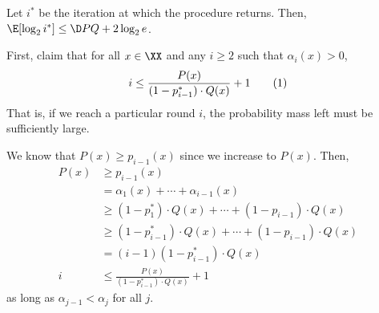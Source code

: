 \documentclass[class=co432,notes,tikz]{agony}
\begin{document}
\begin{prop}\label{prop:rejworst}
  Let $i^*$ be the iteration at which the procedure returns.
  Then, $\E[\log_2 i^*] \leq \D P Q + 2\log_2 e$.
\end{prop}
\begin{prf}
  First, claim that for all $x \in \XX$ and any $i \geq 2$
  such that $\alpha_i(x) > 0$,
  \[ i \leq \frac{P(x)}{(1-p_{i-1}^*) \cdot Q(x)} + 1 \nr{eq:maxi} \]
  That is, if we reach a particular round $i$,
  the probability mass left must be sufficiently large.

  We know that $P(x) \geq p_{i-1}(x)$ since we increase to $P(x)$. Then,
  \begin{align*}
    P(x) & \geq p_{i-1}(x)                                               \\
         & = \alpha_1(x) + \dotsb + \alpha_{i-1}(x)                      \\
         & \geq (1-p_1^*)\cdot Q(x) + \dotsb + (1-p_{i-1})\cdot Q(x)     \\
         & \geq (1-p_{i-1}^*)\cdot Q(x) + \dotsb + (1-p_{i-1})\cdot Q(x) \\
         & = (i-1)(1-p_{i-1}^*)\cdot  Q(x)                               \\
    i    & \leq \frac{P(x)}{(1-p_{i-1}^*) \cdot Q(x)} + 1
  \end{align*}
  as long as $\alpha_{j-1} < \alpha_j$ for all $j$.


\end{prf}
\end{document}
